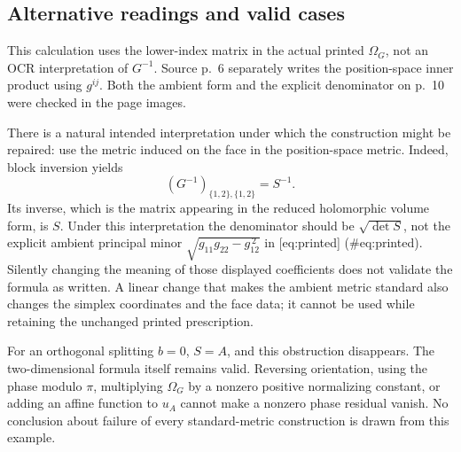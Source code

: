 \documentclass[10pt]{article}
\begin{document}
\subsection*{Alternative readings and valid cases}
This calculation uses the lower-index matrix in the actual printed \(\Omega_G\), not an OCR interpretation of \(G^{-1}\). Source p. 6 separately writes the position-space inner product using \(g^{ij}\). Both the ambient form and the explicit denominator on p. 10 were checked in the page images.\par
There is a natural intended interpretation under which the construction might be repaired: use the metric induced on the face in the position-space metric. Indeed, block inversion yields \[(G^{-1})_{\{1,2\},\{1,2\}}=S^{-1}.\] Its inverse, which is the matrix appearing in the reduced holomorphic volume form, is \(S\). Under this interpretation the denominator should be \(\sqrt{\det S}\), not the explicit ambient principal minor \(\sqrt{g_{11}g_{22}-g_{12}^{\,2}}\) in [eq:printed] (\#eq:printed). Silently changing the meaning of those displayed coefficients does not validate the formula as written. A linear change that makes the ambient metric standard also changes the simplex coordinates and the face data; it cannot be used while retaining the unchanged printed prescription.\par
For an orthogonal splitting \(b=0\), \(S=A\), and this obstruction disappears. The two-dimensional formula itself remains valid. Reversing orientation, using the phase modulo \(\pi\), multiplying \(\Omega_G\) by a nonzero positive normalizing constant, or adding an affine function to \(u_A\) cannot make a nonzero phase residual vanish. No conclusion about failure of every standard-metric construction is drawn from this example.\par
\end{document}
